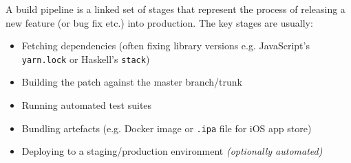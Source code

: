 A build pipeline is a linked set of stages that represent the process of releasing a new feature (or bug fix etc.) into production.
The key stages are usually:
\begin{itemize}
  \item Fetching dependencies (often fixing library versions e.g. JavaScript's \texttt{yarn.lock} or Haskell's \texttt{stack})
  \item Building the patch against the master branch/trunk
  \item Running automated test suites
  \item Bundling artefacts (e.g. Docker image or \texttt{.ipa} file for iOS app store)
  \item Deploying to a staging/production environment \textit{(optionally automated)}
\end{itemize}


